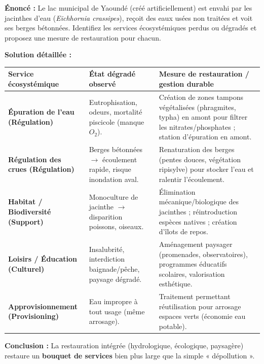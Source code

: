 \documentclass[11pt]{article}
\begin{document}
\begin{exoresolu}
\textbf{Énoncé :} Le lac municipal de Yaoundé (créé artificiellement) est envahi par les jacinthes d'eau (\emph{Eichhornia crassipes}), reçoit des eaux usées non traitées et voit ses berges bétonnées. Identifiez les services écosystémiques perdus ou dégradés et proposez une mesure de restauration pour chacun.

\textbf{Solution détaillée :}
\begin{center}
\begin{tabularx}{\linewidth}{|l|X|X|}\hline
\textbf{Service écosystémique} & \textbf{État dégradé observé} & \textbf{Mesure de restauration / gestion durable} \\ \hline
\textbf{Épuration de l'eau (Régulation)} & Eutrophisation, odeurs, mortalité piscicole (manque $O_2$). & Création de zones tampons végétalisées (phragmites, typha) en amont pour filtrer les nitrates/phosphates ; station d'épuration en amont. \\ \hline
\textbf{Régulation des crues (Régulation)} & Berges bétonnées $\rightarrow$ écoulement rapide, risque inondation aval. & Renaturation des berges (pentes douces, végétation ripisylve) pour stocker l'eau et ralentir l'écoulement. \\ \hline
\textbf{Habitat / Biodiversité (Support)} & Monoculture de jacinthe $\rightarrow$ disparition poissons, oiseaux. & Élimination mécanique/biologique des jacinthes ; réintroduction espèces natives ; création d'îlots de repos. \\ \hline
\textbf{Loisirs / Éducation (Culturel)} & Insalubrité, interdiction baignade/pêche, paysage dégradé. & Aménagement paysager (promenades, observatoires), programmes éducatifs scolaires, valorisation esthétique. \\ \hline
\textbf{Approvisionnement (Provisioning)} & Eau impropre à tout usage (même arrosage). & Traitement permettant réutilisation pour arrosage espaces verts (économie eau potable). \\ \hline
\end{tabularx}
\end{center}
\textbf{Conclusion :} La restauration intégrée (hydrologique, écologique, paysagère) restaure un \textbf{bouquet de services} bien plus large que la simple « dépollution ».
\end{exoresolu}
\end{document}
